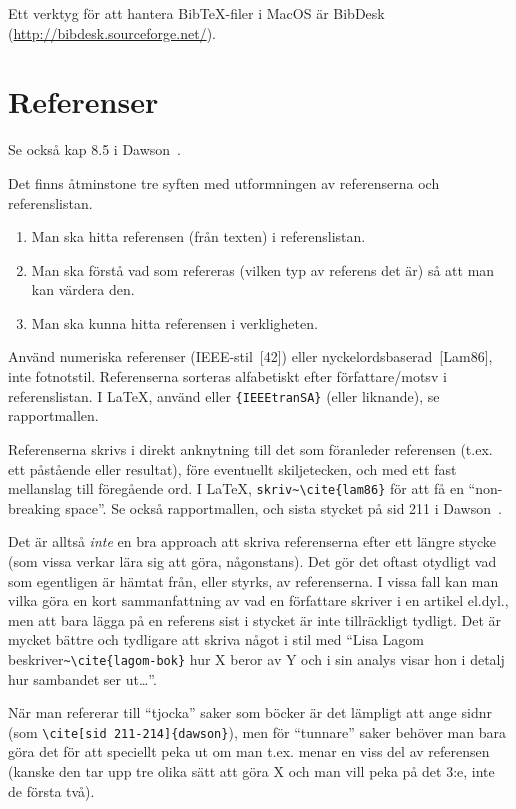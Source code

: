\documentclass[swedish, a4paper,12pt]{article}
\begin{document}
Ett verktyg för att hantera BibTeX-filer i MacOS är BibDesk (\url{http://bibdesk.sourceforge.net/}).


\section{Referenser}
\label{sec:referenser}

Se också kap 8.5 i Dawson~\cite{dawson:projects-in-computing}.

Det finns åtminstone tre syften med utformningen av referenserna och referenslistan.
\begin{enumerate}
\item Man ska hitta referensen (från texten) i referenslistan.
\item Man ska förstå vad som refereras (vilken typ av referens det är) så att man kan värdera den.
\item Man ska kunna hitta referensen i verkligheten.
\end{enumerate}

Använd numeriska referenser (IEEE-stil~[42]) eller nyckelordsbaserad~[Lam86], inte fotnotstil. Referenserna sorteras alfabetiskt efter författare/motsv i referenslistan. I LaTeX, använd \verb|| eller \verb|{IEEEtranSA}| (eller liknande), se rapportmallen.

Referenserna skrivs i direkt anknytning till det som föranleder referensen (t.ex. ett påstående eller resultat), före eventuellt skiljetecken, och med ett fast mellanslag till föregående ord. I LaTeX, \verb|skriv~\cite{lam86}| för att få en ``non-breaking space''. Se också rapportmallen, och sista stycket på sid 211 i Dawson~\cite{dawson:projects-in-computing}.

Det är alltså \emph{inte} en bra approach att skriva referenserna efter ett längre stycke (som vissa verkar lära sig att göra, någonstans). Det gör det oftast otydligt vad som egentligen är hämtat från, eller styrks, av referenserna. I vissa fall kan man vilka göra en kort sammanfattning av vad en författare skriver i en artikel el.dyl., men att bara lägga på en referens sist i stycket är inte tillräckligt tydligt. Det är mycket bättre och tydligare att skriva något i stil med ``Lisa Lagom beskriver\verb|~\cite{lagom-bok}| hur X beror av Y och i sin analys visar hon i detalj hur sambandet ser ut\ldots''.

När man refererar till ``tjocka'' saker som böcker är det lämpligt att ange sidnr
(som \verb|\cite[sid 211-214]{dawson}|), men för ``tunnare'' saker behöver man bara göra det för att speciellt peka ut om man t.ex. menar en viss del av referensen (kanske den tar upp tre olika sätt att göra X och man vill peka på det 3:e, inte de första två).
\end{document}
